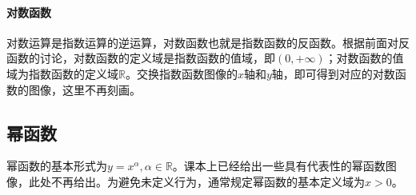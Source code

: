 \newpage
\paragraph{对数函数} \mbox{}

对数运算是指数运算的逆运算，对数函数也就是指数函数的反函数。根据前面对反函数的讨论，对数函数的定义域是指数函数的值域，即\(\left( 0 , + \infty \right)\)；对数函数的值域为指数函数的定义域\(\mathbb{R}\)。交换指数函数图像的\(x\)轴和\(y\)轴，即可得到对应的对数函数的图像，这里不再刻画。

\subsection{幂函数}
幂函数的基本形式为\(y = x^{\alpha} , \alpha \in \mathbb{R}\)。课本上已经给出一些具有代表性的幂函数图像，此处不再给出。为避免未定义行为，通常规定幂函数的基本定义域为\(x > 0\)。
